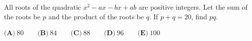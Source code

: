 All roots of the quadratic $x^2-ax-bx+ab$ are positive integers. Let the sum of the roots be $p$ and the product of the roots be $q$. If $p+q=20$, find $pq$.

$\textbf{(A)}\ 80\qquad\textbf{(B)}\ 84\qquad\textbf{(C)}\ 88\qquad\textbf{(D)}\ 96\qquad\textbf{(E)}\ 100$
